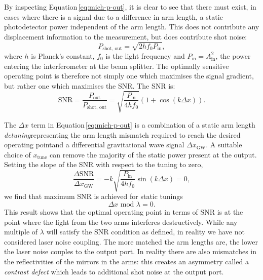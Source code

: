 By inspecting Equation\,\ref{eq:mich-p-out}, it is clear to see that there must exist, in cases where there is a signal due to a difference in arm length, a static photodetector power independent of the arm length. This does not contribute any displacement information to the measurement, but does contribute shot noise:
\begin{equation}
  P_{\text{shot, out}} = \sqrt{2 h f_0 P_{\text{in}}},
\end{equation}
where $h$ is Planck's constant, $f_0$ is the light frequency and $P_{\text{in}} = A_{\text{in}}^2$, the power entering the interferometer at the beam splitter. The optimally sensitive operating point is therefore not simply one which maximises the signal gradient, but rather one which maximises the \gls{SNR}. The \gls{SNR} is:
\begin{equation}
  \text{SNR} = \frac{P_{\text{out}}}{P_{\text{shot, out}}} = \sqrt{\frac{P_{\text{in}}}{4 h f_0}} \left( 1 + \cos \left(k \Delta x \right) \right).
\end{equation}

The $\Delta x$ term in Equation\,\ref{eq:mich-p-out} is a combination of a static arm length \emph{detuning}\textemdash representing the arm length mismatch required to reach the desired operating point\textemdash and a differential gravitational wave signal $\Delta x_{\text{GW}}$. A suitable choice of $ x_{\text{tune}}$ can remove the majority of the static power present at the output. Setting the slope of the \gls{SNR} with respect to the tuning to zero,
\begin{equation}
  \frac{\Delta \text{SNR}}{\Delta x_{\text{GW}}} = -k \sqrt{\frac{P_{\text{in}}}{4 h f_0}} \sin \left(k \Delta x\right) = 0,
\end{equation}
we find that maximum \gls{SNR} is achieved for static tunings 
\begin{equation}
  \Delta x \text{ mod } \lambda = 0.
\end{equation}
This result shows that the optimal operating point in terms of \gls{SNR} is at the point where the light from the two arms interferes destructively. While any multiple of $\lambda$ will satisfy the \gls{SNR} condition as defined, in reality we have not considered laser noise coupling. The more matched the arm lengths are, the lower the laser noise couples to the output port. In reality there are also mismatches in the reflectivities of the mirrors in the arms: this creates an asymmetry called a \emph{contrast defect} which leads to additional shot noise at the output port.

